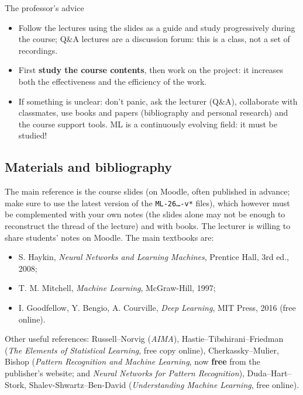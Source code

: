 \begin{boxtip}{The professor's advice}

\begin{itemize}
\tightlist
\item
  Follow the lectures using the slides as a guide and study
  progressively during the course; Q\&A lectures are a discussion
  forum: this is a class, not a set of recordings.
\item
  First \textbf{study the course contents}, then work on the project:
  it increases both the effectiveness and the efficiency of the work.
\item
  If something is unclear: don't panic, ask the lecturer (Q\&A),
  collaborate with classmates, use books and papers (bibliography and
  personal research) and the course support tools. ML is a
  continuously evolving field: it must be studied!
\end{itemize}

\end{boxtip}

\subsection{Materials and bibliography}\label{materiale-e-bibliografia}

The main reference is the course slides (on Moodle, often published in
advance; make sure to use the latest version of the
\texttt{ML-26…-v*} files), which however must be complemented with
your own notes (the slides alone may not be enough to reconstruct the
thread of the lecture) and with books. The lecturer is willing to share
students' notes on Moodle. The main textbooks are:

\begin{itemize}
\tightlist
\item
  S. Haykin, \emph{Neural Networks and Learning Machines}, Prentice
  Hall, 3rd ed., 2008;
\item
  T. M. Mitchell, \emph{Machine Learning}, McGraw-Hill, 1997;
\item
  I. Goodfellow, Y. Bengio, A. Courville, \emph{Deep Learning}, MIT
  Press, 2016 (free online).
\end{itemize}

Other useful references: Russell--Norvig (\emph{AIMA}),
Hastie--Tibshirani--Friedman (\emph{The Elements of Statistical
Learning}, free copy online), Cherkassky--Mulier, Bishop
(\emph{Pattern Recognition and Machine Learning}, now \textbf{free}
from the publisher's website; and \emph{Neural Networks for Pattern
Recognition}), Duda--Hart--Stork, Shalev-Shwartz--Ben-David
(\emph{Understanding Machine Learning}, free online).

